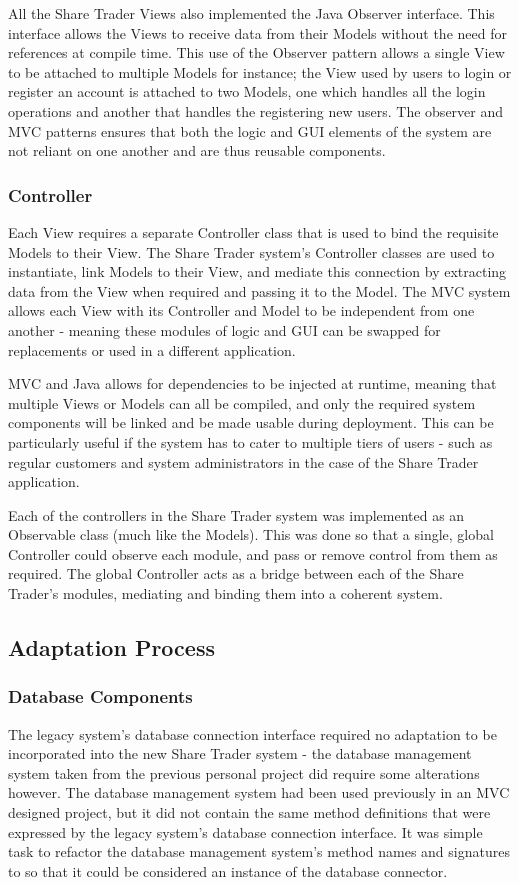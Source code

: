 \documentclass[12pt, a4paper,titlepage]{article}
\begin{document}
All the Share Trader Views also implemented the Java Observer interface. 
This interface allows the Views to receive data from their Models without the
need for references at compile time. 
This use of the Observer pattern allows a single View to be attached to
multiple Models for instance; the View used by users to login or register an
account is attached to two Models, one which handles all the login operations
and another that handles the registering new users. 
The observer and MVC patterns ensures that both the logic and GUI elements of
the system are not reliant on one another and are thus reusable components.

\subsubsection{Controller}
Each View requires a separate Controller class that is used to bind the
requisite Models to their View. 
The Share Trader system's Controller classes are used to instantiate, link
Models to their View, and mediate this connection by extracting data from the
View when required and passing it to the Model. 
The MVC system allows each View with its Controller and Model to be independent
from one another - meaning these modules of logic and GUI can be
swapped for replacements or used in a different application.

MVC and Java allows for dependencies to be injected at runtime, meaning that
multiple Views or Models can all be compiled, and only the required system
components will be linked and be made usable during deployment. 
This can be particularly useful if the system has to cater to multiple tiers
of users - such as regular customers and system administrators in the case of
the Share Trader application.

Each of the controllers in the Share Trader system was implemented as an
Observable class (much like the Models). 
This was done so that a single, global Controller could observe each module,
and pass or remove control from them as required. 
The global Controller acts as a bridge between each of the Share Trader's
modules, mediating and binding them into a coherent system.

\subsection{Adaptation Process}
\subsubsection{Database Components}
The legacy system's database connection interface required no adaptation to be
incorporated into the new Share Trader system - the database management system
taken from the previous personal project did require some alterations however.
The database management system had been used previously in an MVC designed
project, but it did not contain the same method definitions that were
expressed by the legacy system’s database connection interface. 
It was simple task to refactor the database management system's method names
and signatures to so that it could be considered an instance of the database
connector.
\end{document}
